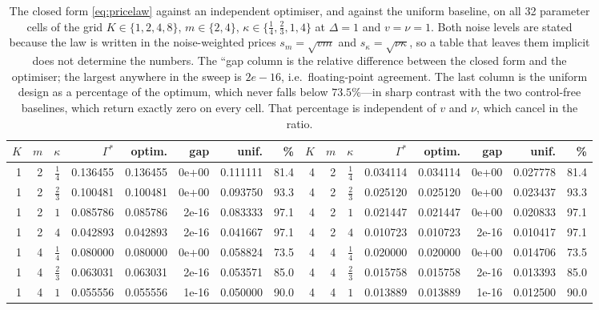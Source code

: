 \begin{table}[t]
\caption{The closed form \eqref{eq:pricelaw} against an independent optimiser, and against the uniform baseline, on all 32 parameter cells of the grid $K\in\{1,2,4,8\}$, $m\in\{2,4\}$, $\kappa\in\{\frac14,\frac23,1,4\}$ at $\Delta=1$ and $v=\nu=1$. Both noise levels are stated because the law is written in the noise-weighted prices $s_{m}=\sqrt{vm}$ and $s_{\kappa}=\sqrt{\nu\kappa}$, so a table that leaves them implicit does not determine the numbers. The ``gap column is the relative difference between the closed form and the optimiser; the largest anywhere in the sweep is $2e-16$, i.e.\ floating-point agreement. The last column is the uniform design as a percentage of the optimum, which never falls below $73.5\%$---in sharp contrast with the two control-free baselines, which return exactly zero on every cell. That percentage is independent of $v$ and $\nu$, which cancel in the ratio.}
\label{tab:cells}
\centering
\footnotesize
\setlength{\tabcolsep}{4pt}
\begin{tabular}{@{}rrrrrrrr@{\hspace{10pt}}|@{\hspace{10pt}}rrrrrrrr@{}}
\toprule
$K$ & $m$ & $\kappa$ & $\Gamma^{*}$ & optim. & gap & unif. & \% & $K$ & $m$ & $\kappa$ & $\Gamma^{*}$ & optim. & gap & unif. & \% \\
\midrule
1 & 2 & $\frac14$ & 0.136455 & 0.136455 & 0e+00 & 0.111111 & 81.4 & 4 & 2 & $\frac14$ & 0.034114 & 0.034114 & 0e+00 & 0.027778 & 81.4 \\
1 & 2 & $\frac23$ & 0.100481 & 0.100481 & 0e+00 & 0.093750 & 93.3 & 4 & 2 & $\frac23$ & 0.025120 & 0.025120 & 0e+00 & 0.023437 & 93.3 \\
1 & 2 & $1$ & 0.085786 & 0.085786 & 2e-16 & 0.083333 & 97.1 & 4 & 2 & $1$ & 0.021447 & 0.021447 & 0e+00 & 0.020833 & 97.1 \\
1 & 2 & $4$ & 0.042893 & 0.042893 & 2e-16 & 0.041667 & 97.1 & 4 & 2 & $4$ & 0.010723 & 0.010723 & 2e-16 & 0.010417 & 97.1 \\
1 & 4 & $\frac14$ & 0.080000 & 0.080000 & 0e+00 & 0.058824 & 73.5 & 4 & 4 & $\frac14$ & 0.020000 & 0.020000 & 0e+00 & 0.014706 & 73.5 \\
1 & 4 & $\frac23$ & 0.063031 & 0.063031 & 2e-16 & 0.053571 & 85.0 & 4 & 4 & $\frac23$ & 0.015758 & 0.015758 & 2e-16 & 0.013393 & 85.0 \\
1 & 4 & $1$ & 0.055556 & 0.055556 & 1e-16 & 0.050000 & 90.0 & 4 & 4 & $1$ & 0.013889 & 0.013889 & 1e-16 & 0.012500 & 90.0 \\

\end{tabular}
\end{table}
